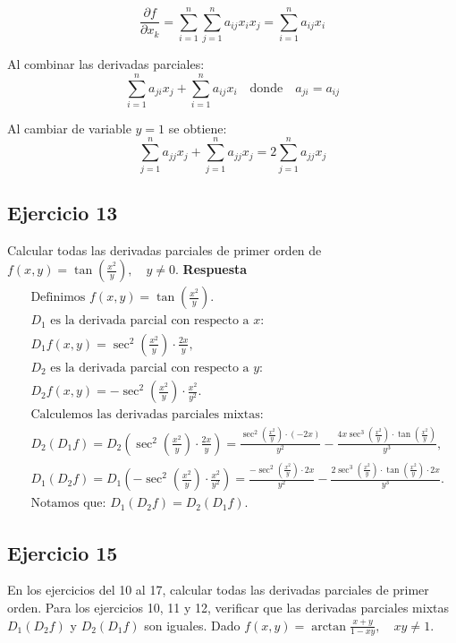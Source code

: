 \documentclass{report}
\begin{document}
    \[
    \frac{\partial f}{\partial x_k} = \sum_{i=1}^n \sum_{j=1}^n a_{ij} x_i x_j = \sum_{i=1}^n a_{ij} x_i
    \]

    Al combinar las derivadas parciales:
    \[
    \sum_{i=1}^n a_{ji} x_j + \sum_{i=1}^n a_{ij} x_i \quad \text{donde} \quad a_{ji}=a_{ij}
    \]

    Al cambiar de variable $y=1$ se obtiene:
    \[
    \sum_{j=1}^n a_{jj} x_j + \sum_{j=1}^n a_{jj} x_j = 2 \sum_{j=1}^n a_{jj} x_j
    \]\subsection*{Ejercicio 13}
    Calcular todas las derivadas parciales de primer orden de \( f(x, y)=\tan \left(\frac{x^{2}}{y}\right), \quad y \neq 0 \).
    \textbf{Respuesta}
    $$
    \begin{aligned}
    & \text{Definimos } f(x, y)=\tan \left(\frac{x^2}{y}\right). \\
    & D_1 \text{ es la derivada parcial con respecto a } x: \\
    & D_1 f(x, y) = \sec^2\left(\frac{x^2}{y}\right) \cdot \frac{2x}{y}, \\
    & D_2 \text{ es la derivada parcial con respecto a } y: \\
    & D_2 f(x, y) = -\sec^2\left(\frac{x^2}{y}\right) \cdot \frac{x^2}{y^2}. \\
    & \text{Calculemos las derivadas parciales mixtas:} \\
    & D_2\left(D_1 f\right) = D_2\left(\sec^2\left(\frac{x^2}{y}\right) \cdot \frac{2x}{y}\right) 
    = \frac{\sec^2\left(\frac{x^2}{y}\right) \cdot (-2x)}{y^2} - \frac{4x \sec^3\left(\frac{x^2}{y}\right) \cdot \tan\left(\frac{x^2}{y}\right)}{y^3}, \\
    & D_1\left(D_2 f\right) = D_1\left(-\sec^2\left(\frac{x^2}{y}\right) \cdot \frac{x^2}{y^2}\right) 
    = \frac{-\sec^2\left(\frac{x^2}{y}\right) \cdot 2x}{y^2} - \frac{2 \sec^3\left(\frac{x^2}{y}\right) \cdot \tan\left(\frac{x^2}{y}\right) \cdot 2x}{y^3}. \\
    & \text{Notamos que: } D_1\left(D_2 f\right) = D_2\left(D_1 f\right).
    \end{aligned}
    $$
    \subsection*{Ejercicio 15}
    En los ejercicios del 10 al 17, calcular todas las derivadas parciales de primer orden. Para los ejercicios 10, 11 y 12, verificar que las derivadas parciales mixtas $D_{1}\left(D_{2} f\right)$ y $D_{2}\left(D_{1} f\right)$ son iguales.
    Dado $f(x, y) = \arctan \frac{x + y}{1 - xy}, \quad xy \neq 1$.
\end{document}

